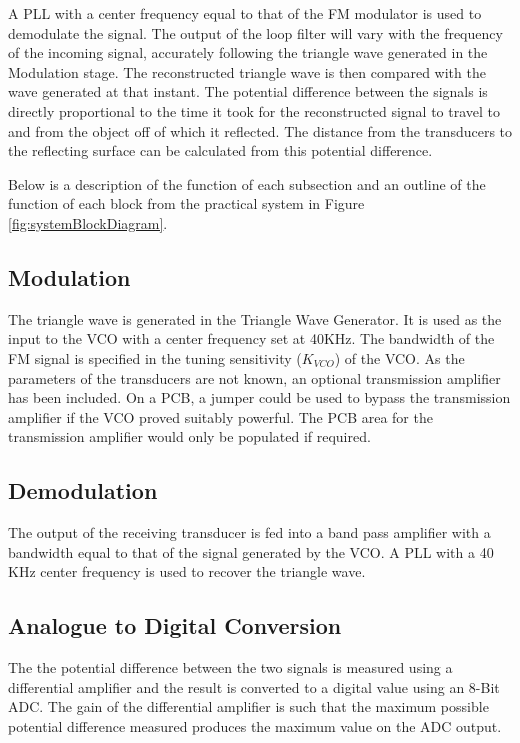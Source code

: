 A PLL with a center frequency equal to that of the FM modulator is used to demodulate the signal. 
The output of the loop filter will vary with the frequency of the incoming signal, accurately following the triangle wave generated in the Modulation stage. 
The reconstructed triangle wave is then compared with the wave generated at that instant. 
The potential difference between the signals is directly proportional to the time it took for the reconstructed signal to travel to and from the object off of which it reflected.
The distance from the transducers to the reflecting surface can be calculated from this potential difference. 

Below is a description of the function of each subsection and an outline of the function of each block from the practical system in Figure \ref{fig:systemBlockDiagram}. 

\subsection{Modulation}
The triangle wave is generated in the Triangle Wave Generator.
It is used as the input to the VCO with a center frequency set at 40KHz. 
The bandwidth of the FM signal is specified in the tuning sensitivity ($K_{VCO}$) of the VCO.
As the parameters of the transducers are not known, an optional transmission amplifier has been included.
On a PCB, a jumper could be used to bypass the transmission amplifier if the VCO proved suitably powerful. 
The PCB area for the transmission amplifier would only be populated if required.

\subsection{Demodulation}
The output of the receiving transducer is fed into a band pass amplifier with a bandwidth equal to that of the signal generated by the VCO. 
A PLL with a 40 KHz center frequency is used to recover the triangle wave.

\subsection{Analogue to Digital Conversion}
The the potential difference between the two signals is measured using a differential amplifier and the result is converted to a digital value using an 8-Bit ADC. 
The gain of the differential amplifier is such that the maximum possible potential difference measured produces the maximum value on the ADC output. 

